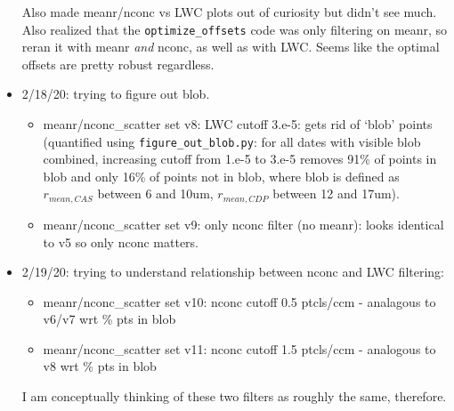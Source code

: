 \documentclass{article}
\begin{document}
\begin{itemize}
Also made meanr/nconc vs LWC plots out of curiosity but didn't see much. Also realized that the \texttt{optimize\_offsets} code was only filtering on meanr, so reran it with meanr \emph{and} nconc, as well as with LWC. Seems like the optimal offsets are pretty robust regardless.
	\item 2/18/20: trying to figure out blob. 
	\begin{itemize}
		\item meanr/nconc\_scatter set v8: LWC cutoff 3.e-5: gets rid of `blob' points (quantified using \texttt{figure\_out\_blob.py}: for all dates with visible blob combined, increasing cutoff from 1.e-5 to 3.e-5 removes 91\% of points in blob and only 16\% of points not in blob, where blob is defined as $r_{mean, CAS}$ between 6 and 10um, $r_{mean, CDP}$ between 12 and 17um).
		\item meanr/nconc\_scatter set v9: only nconc filter (no meanr): looks identical to v5 so only nconc matters.
	\end{itemize}
	\item 2/19/20: trying to understand relationship between nconc and LWC filtering:
	\begin{itemize}
		\item meanr/nconc\_scatter set v10: nconc cutoff 0.5 ptcls/ccm - analagous to v6/v7 wrt \% pts in blob
		\item meanr/nconc\_scatter set v11: nconc cutoff 1.5 ptcls/ccm - analogous to v8 wrt \% pts in blob
	\end{itemize}
	I am conceptually thinking of these two filters as roughly the same, therefore.


\end{itemize}
\end{document}

